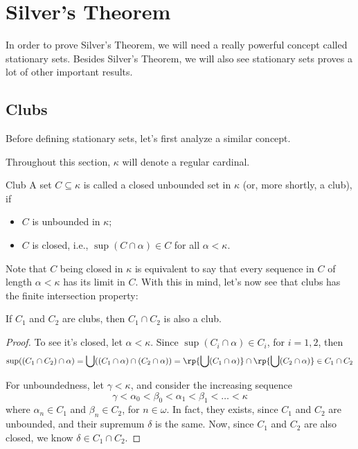 \chapter{Silver's Theorem}

In order to prove Silver's Theorem, we will need a really powerful concept called stationary sets. Besides Silver's Theorem, we will also see stationary sets proves a lot of other important results.

\section{Clubs}

Before defining stationary sets, let's first analyze a similar concept.

Throughout this section, $\kappa$ will denote a regular cardinal.

\begin{definition}{Club}{}
    A set $C\subseteq\kappa$ is called a \textcolor{laser_eyes!80!black}{closed unbounded set in $\kappa$} (or, more shortly, a \textcolor{laser_eyes!80!black}{club}), if
    \begin{itemize}
        \item $C$ is unbounded in $\kappa$;
        \item $C$ is closed, i.e., $\sup(C\cap\alpha)\in C$ for all $\alpha<\kappa$.
    \end{itemize}
\end{definition}

Note that $C$ being closed in $\kappa$ is equivalent to say that every sequence in $C$ of length $\alpha<\kappa$ has its limit in $C$. With this in mind, let's now see that clubs has the finite intersection property:

\begin{lemma}{}{}
    If $C_1$ and $C_2$ are clubs, then $C_1\cap C_2$ is also a club.
\end{lemma}

\begin{proof}
    To see it's closed, let $\alpha<\kappa$. Since $\sup(C_i\cap\alpha)\in C_i$, for $i=1,2$, then
    $$\sup((C_1\cap C_2)\cap\alpha)=\bigcup((C_1\cap\alpha)\cap(C_2\cap\alpha))=\rp{\bigcup(C_1\cap\alpha)}\cap\rp{\bigcup(C_2\cap\alpha)}\in C_1\cap C_2$$

    For unboundedness, let $\gamma<\kappa$, and consider the increasing sequence
    $$\gamma<\alpha_0<\beta_0<\alpha_1<\beta_1<\dots<\kappa$$
    where $\alpha_n\in C_1$ and $\beta_n\in C_2$, for $n\in\omega$. In fact, they exists, since $C_1$ and $C_2$ are unbounded, and their supremum $\delta$ is the same. Now, since $C_1$ and $C_2$ are also closed, we know $\delta\in C_1\cap C_2$.
\end{proof}

